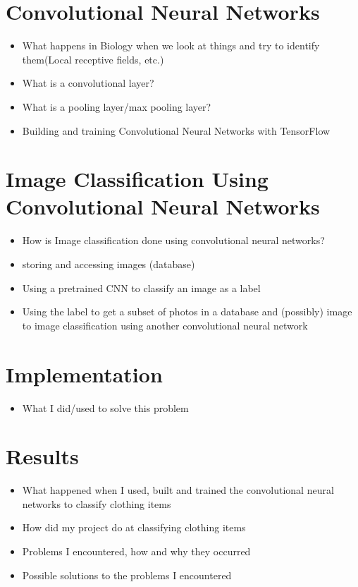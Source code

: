 \documentclass[12pt]{article} %
\begin{document}
\section{Convolutional Neural Networks}
\begin{itemize}
\item What happens in Biology when we look at things and try to identify them(Local receptive fields, etc.)
\item What is a convolutional layer?
\item What is a pooling layer/max pooling layer?
\item Building and training Convolutional Neural Networks with TensorFlow
\end{itemize}

\section{Image Classification Using Convolutional Neural Networks}
\begin{itemize}
\item How is Image classification done using convolutional neural networks?
\item storing and accessing images (database)
\item Using a pretrained CNN to classify an image as a label
\item Using the label to get a subset of photos in a database and (possibly) image to image classification using another convolutional neural network
\end{itemize}

\section{Implementation}
\begin{itemize}
\item What I did/used to solve this problem
\end{itemize}

\section{Results}
\begin{itemize}
\item What happened when I used, built and trained the convolutional neural networks to classify clothing items
\item How did my project do at classifying clothing items
\item Problems I encountered, how and why they occurred
\item Possible solutions to the problems I encountered
\end{itemize}
\end{document}
